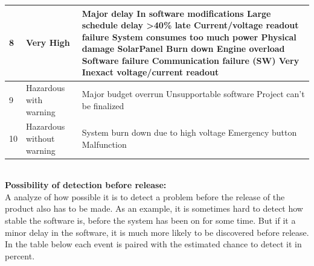 \documentclass[12pt,a4paper]{report}
\begin{document}
\begin{tabular}{|l|p{4cm}|p{10cm}|}
\hline 8 & Very High & Major delay In software modifications \newline
Large schedule delay \textgreater 40\% late\newline
Current/voltage readout failure\newline
System consumes too much power\newline
Physical damage\newline
SolarPanel Burn down\newline
Engine overload\newline
Software failure\newline
Communication failure (SW)\newline
Very Inexact voltage/current readout \\ 

\hline 9 & Hazardous with warning & Major budget overrun\newline
Unsupportable software\newline
Project can’t be finalized \\ 

\hline 10 & Hazardous without warning & System burn down due to high voltage\newline
Emergency button Malfunction \\ 

\hline 
\end{tabular} 
\\

\textbf{Possibility of detection before release:}\\

A analyze of how possible it is to detect a problem before the release of the product also has to be made. As an example, it is sometimes hard to detect how stable the software is, before the system has been on for some time. But if it a minor delay in the software, it is much more likely to be discovered before release.\\
In the table below each event is paired with the estimated chance to detect it in percent.\\
\end{document}
